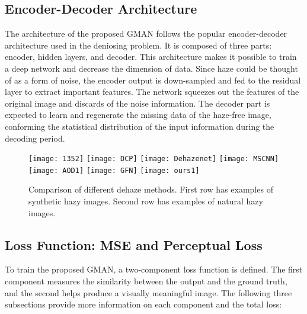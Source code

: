 \documentclass[journal]{IEEEtran}
\begin{document}
\subsection{Encoder-Decoder Architecture}

The architecture of the proposed GMAN follows the popular encoder-decoder architecture used in the deniosing problem. It is composed of three parts: encoder, hidden layers, and decoder. This architecture makes it possible to train a deep network and decrease the dimension of data. Since haze could be thought of as a form of noise, the encoder output is down-sampled and fed to the residual layer to extract important features. The network squeezes out the features of the original image and discards of the noise information. The decoder part is expected to learn and regenerate the missing data of the haze-free image, conforming the statistical distribution of the input information during the decoding period.

\begin{figure*}
	\texttt{[image: 1352]}
	\texttt{[image: DCP]}
	\texttt{[image: Dehazenet]}
	\texttt{[image: MSCNN]}
	\texttt{[image: AOD1]}
	\texttt{[image: GFN]}
	\texttt{[image: ours1]}
	\centering
\end{figure*}
\begin{figure*}
	\captionsetup{justification=centering}
	\centering
	\caption{Comparison of different dehaze methods. First row has examples of synthetic hazy images. Second row has examples of natural hazy images.}
	\label{figComp}
\end{figure*}

\subsection{Loss Function: MSE and Perceptual Loss}

To train the proposed GMAN, a two-component loss function is defined. The first component measures the similarity between the output and the ground truth, and the second helps produce a visually meaningful image. The following three subsections provide more information on each component and the total loss:
\end{document}
